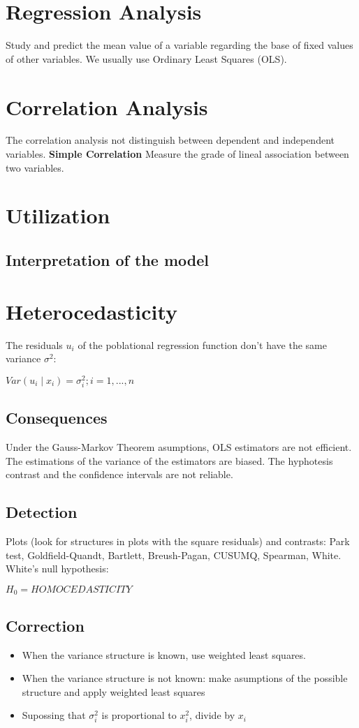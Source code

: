 \documentclass[10pt,landscape]{article}
\begin{document}
\begin{multicols}{3}

\section*{Regression Analysis}
Study and predict the mean value of a variable regarding the base of fixed values of other variables.
We usually use Ordinary Least Squares (OLS).

\section*{Correlation Analysis}
The correlation analysis not distinguish between dependent and independent variables.
\textbf{Simple Correlation}
Measure the grade of lineal association between two variables.

\section*{Utilization}
\subsection*{Interpretation of the model}


\section*{Heterocedasticity}
The residuals $u_i$ of the poblational regression function don't have the same variance $\sigma^2$:

$Var(u_i \mid x_i) = \sigma_i^2; i = 1, ..., n$

\subsection*{Consequences}
Under the Gauss-Markov Theorem asumptions, OLS estimators are not efficient. The estimations of the variance of the estimators are biased. The hyphotesis contrast and the confidence intervals are not reliable.
\subsection*{Detection}
Plots (look for structures in plots with the square residuals) and contrasts: Park test, Goldfield-Quandt, Bartlett, Breush-Pagan, CUSUMQ, Spearman, White.
White's null hypothesis:

$H_0 = HOMOCEDASTICITY$
\subsection*{Correction}
\begin{itemize}
	\item When the variance structure is known, use weighted least squares.
	\item When the variance structure is not known: make asumptions of the possible structure and apply weighted least squares
	\item Supossing that $\sigma_i^2$ is proportional to $x_i^2$, divide by $x_i$
\end{itemize}
\lipsum

\end{multicols}
\end{document}
